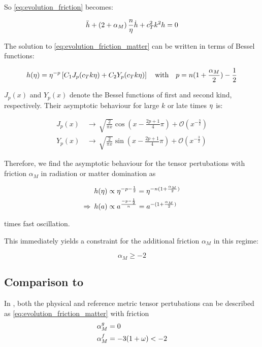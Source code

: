 \documentclass{scrreprt}
\begin{document}
So \ref{eq:evolution_friction} becomes:

\begin{equation}\label{eq:evolution_friction_matter}
	\ddot{h} + \left( 2 + \alpha_M \right) \frac{n}{\eta} \dot{h} + c_T^2 k^2 h = 0
\end{equation}

The solution to \ref{eq:evolution_friction_matter} can be written in terms of Bessel functions:

\begin{equation}
	h(\eta) = \eta^{-p} \left[C_1 J_p(c_T k \eta) + C_2 Y_p(c_T k \eta) \right] \quad \textrm{with} \quad p = n(1+\frac{\alpha_M}{2})-\frac{1}{2}
\end{equation}

$J_p(x)$ and $Y_p(x)$ denote the Bessel functions of first and second kind, respectively. Their asymptotic behaviour for large $k$ or late times $\eta$ is:

\begin{align}
	J_p(x) \, &\rightarrow \, \sqrt{\frac{2}{\pi x}} \cos(x-\frac{2p+1}{4}\pi) + \mathcal{O}(x^{-\frac{3}{2}}) \\
	Y_p(x) \, &\rightarrow \, \sqrt{\frac{2}{\pi x}} \sin(x-\frac{2p+1}{4}\pi) + \mathcal{O}(x^{-\frac{3}{2}})
\end{align}

Therefore, we find the asymptotic behaviour for the tensor pertubations with friction $\alpha_M$ in radiation or matter domination as

\begin{align}
	h(\eta) &\propto \eta^{-p-\frac{1}{2}} = \eta^{-n(1+\frac{\alpha_M}{2})} \\
	\Rightarrow \: h(a) &\propto a^{\frac{-p-\frac{1}{2}}{n}} = a^{-(1+\frac{\alpha_M}{2})}
\end{align}

times fast oscillation.

This immediately yields a constraint for the additional friction $\alpha_M$ in this regime:

\begin{equation}
	\alpha_M \geq -2
\end{equation}


\subsection{Comparison to \cite{Amendola2015}}

In \citep{Amendola2015}, both the physical and reference metric tensor pertubations can be described as \ref{eq:evolution_friction_matter} with friction
\begin{align}
	\alpha_M^{g} &= 0 \\
	\alpha_M^{f} &= -3(1+\omega) < -2
\end{align}
\end{document}
